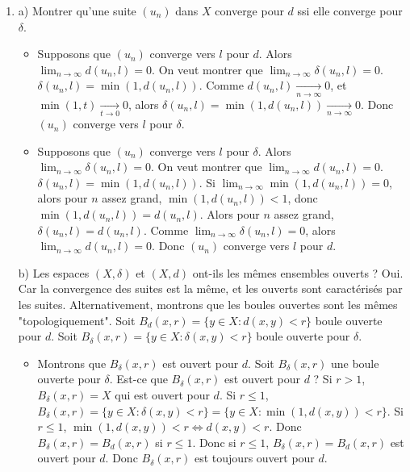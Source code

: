 \documentclass[oneside]{book}
\begin{document}
\begin{solution}
\begin{enumerate}
\begin{enumerate}
    \end{enumerate}

    \item a) Montrer qu'une suite $(u_n)$ dans $X$ converge pour $d$ ssi elle converge pour $\delta$.
    \begin{itemize}
        \item Supposons que $(u_n)$ converge vers $l$ pour $d$. Alors $\lim_{n \to \infty} d(u_n, l) = 0$.
              On veut montrer que $\lim_{n \to \infty} \delta(u_n, l) = 0$.
              $\delta(u_n, l) = \min(1, d(u_n, l))$. Comme $d(u_n, l) \xrightarrow[n \to \infty]{} 0$, et $\min(1, t) \xrightarrow[t \to 0]{} 0$, alors $\delta(u_n, l) = \min(1, d(u_n, l)) \xrightarrow[n \to \infty]{} 0$. Donc $(u_n)$ converge vers $l$ pour $\delta$.

        \item Supposons que $(u_n)$ converge vers $l$ pour $\delta$. Alors $\lim_{n \to \infty} \delta(u_n, l) = 0$.
              On veut montrer que $\lim_{n \to \infty} d(u_n, l) = 0$.
              $\delta(u_n, l) = \min(1, d(u_n, l))$. Si $\lim_{n \to \infty} \min(1, d(u_n, l)) = 0$, alors pour $n$ assez grand, $\min(1, d(u_n, l)) < 1$, donc $\min(1, d(u_n, l)) = d(u_n, l)$.
              Alors pour $n$ assez grand, $\delta(u_n, l) = d(u_n, l)$.
              Comme $\lim_{n \to \infty} \delta(u_n, l) = 0$, alors $\lim_{n \to \infty} d(u_n, l) = 0$. Donc $(u_n)$ converge vers $l$ pour $d$.

    \end{itemize}

    b) Les espaces $(X, \delta)$ et $(X, d)$ ont-ils les mêmes ensembles ouverts ? Oui. Car la convergence des suites est la même, et les ouverts sont caractérisés par les suites.
    Alternativement, montrons que les boules ouvertes sont les mêmes "topologiquement".
    Soit $B_d(x, r) = \{y \in X : d(x, y) < r\}$ boule ouverte pour $d$.
    Soit $B_\delta(x, r) = \{y \in X : \delta(x, y) < r\}$ boule ouverte pour $\delta$.
    \begin{itemize}
        \item Montrons que $B_\delta(x, r)$ est ouvert pour $d$.
              Soit $B_\delta(x, r)$ une boule ouverte pour $\delta$. Est-ce que $B_\delta(x, r)$ est ouvert pour $d$ ?
              Si $r > 1$, $B_\delta(x, r) = X$ qui est ouvert pour $d$.
              Si $r \leq 1$, $B_\delta(x, r) = \{y \in X : \delta(x, y) < r\} = \{y \in X : \min(1, d(x, y)) < r\}$.
              Si $r \leq 1$, $\min(1, d(x, y)) < r \iff d(x, y) < r$.
              Donc $B_\delta(x, r) = B_d(x, r)$ si $r \leq 1$.
              Donc si $r \leq 1$, $B_\delta(x, r) = B_d(x, r)$ est ouvert pour $d$.
              Donc $B_\delta(x, r)$ est toujours ouvert pour $d$.


\end{itemize}
\end{enumerate}
\end{solution}
\end{document}
